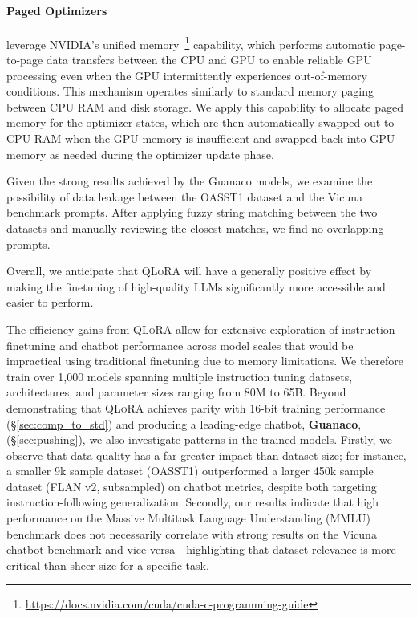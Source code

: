\paragraph{Paged Optimizers} leverage NVIDIA's unified memory~\footnote{\tiny \url{https://docs.nvidia.com/cuda/cuda-c-programming-guide}} capability, which performs automatic page-to-page data transfers between the CPU and GPU to enable reliable GPU processing even when the GPU intermittently experiences out-of-memory conditions. This mechanism operates similarly to standard memory paging between CPU RAM and disk storage. We apply this capability to allocate paged memory for the optimizer states, which are then automatically swapped out to CPU RAM when the GPU memory is insufficient and swapped back into GPU memory as needed during the optimizer update phase.

Given the strong results achieved by the {Guanaco} models, we examine the possibility of data leakage between the OASST1 dataset and the Vicuna benchmark prompts. After applying fuzzy string matching between the two datasets and manually reviewing the closest matches, we find no overlapping prompts.

Overall, we anticipate that \textsc{QLoRA} will have a generally positive effect by making the finetuning of high-quality LLMs significantly more accessible and easier to perform.

The efficiency gains from \textsc{QLoRA} allow for extensive exploration of instruction finetuning and chatbot performance across model scales that would be impractical using traditional finetuning due to memory limitations. We therefore train over 1,000 models spanning multiple instruction tuning datasets, architectures, and parameter sizes ranging from 80M to 65B. Beyond demonstrating that \textsc{QLoRA} achieves parity with 16-bit training performance (\S\ref{sec:comp_to_std}) and producing a leading-edge chatbot, \textbf{Guanaco}, (\S\ref{sec:pushing}), we also investigate patterns in the trained models. Firstly, we observe that data quality has a far greater impact than dataset size; for instance, a smaller 9k sample dataset (OASST1) outperformed a larger 450k sample dataset (FLAN v2, subsampled) on chatbot metrics, despite both targeting instruction-following generalization. Secondly, our results indicate that high performance on the Massive Multitask Language Understanding (MMLU) benchmark does not necessarily correlate with strong results on the Vicuna chatbot benchmark and vice versa—highlighting that dataset relevance is more critical than sheer size for a specific task.


